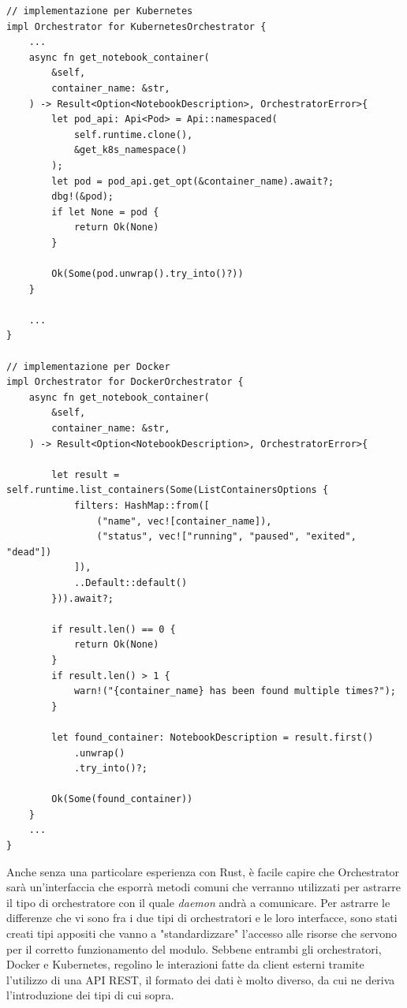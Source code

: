 \begin{verbatim}
// implementazione per Kubernetes
impl Orchestrator for KubernetesOrchestrator {
    ... 
    async fn get_notebook_container(
        &self, 
        container_name: &str,
    ) -> Result<Option<NotebookDescription>, OrchestratorError>{
        let pod_api: Api<Pod> = Api::namespaced(
            self.runtime.clone(), 
            &get_k8s_namespace()
        );
        let pod = pod_api.get_opt(&container_name).await?;
        dbg!(&pod);
        if let None = pod {
            return Ok(None)
        }

        Ok(Some(pod.unwrap().try_into()?))
    }

    ...
}

// implementazione per Docker
impl Orchestrator for DockerOrchestrator {
    async fn get_notebook_container(
        &self, 
        container_name: &str,
    ) -> Result<Option<NotebookDescription>, OrchestratorError>{
        
        let result = self.runtime.list_containers(Some(ListContainersOptions {
            filters: HashMap::from([
                ("name", vec![container_name]),
                ("status", vec!["running", "paused", "exited", "dead"])
            ]),
            ..Default::default()
        })).await?;
        
        if result.len() == 0 {
            return Ok(None)
        }
        if result.len() > 1 {
            warn!("{container_name} has been found multiple times?");
        }
    
        let found_container: NotebookDescription = result.first()
            .unwrap()
            .try_into()?;
    
        Ok(Some(found_container))
    }
    ...
}
\end{verbatim}
Anche senza una particolare esperienza con Rust, è facile capire che Orchestrator sarà un'interfaccia che esporrà metodi comuni che verranno utilizzati per astrarre il tipo di orchestratore con il quale \textit{daemon} andrà a comunicare.
\newline
Per astrarre le differenze che vi sono fra i due tipi di orchestratori e le loro interfacce, sono stati creati tipi appositi che vanno a "standardizzare" l'accesso alle risorse che servono per il corretto funzionamento del modulo. Sebbene entrambi gli orchestratori, Docker e Kubernetes, regolino le interazioni fatte da client esterni tramite l'utilizzo di una API REST, il formato dei dati è molto diverso, da cui ne deriva l'introduzione dei tipi di cui sopra.\newline
